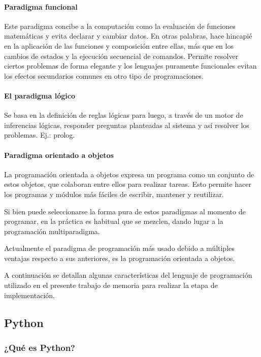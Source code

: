 \documentclass[12pt,legalpaper]{report}
\begin{document}
					\paragraph{Paradigma funcional}
				 
Este paradigma concibe a la computación como la evaluación de funciones matemáticas y evita declarar y cambiar datos. En otras palabras, hace hincapié en la aplicación de las funciones y composición entre ellas, más que en los cambios de estados y la ejecución secuencial de comandos. Permite resolver ciertos problemas de forma elegante y los lenguajes puramente funcionales evitan los efectos secundarios comunes en otro tipo de programaciones.
	
					\paragraph{El paradigma lógico}
				
Se basa en la definición de reglas lógicas para luego, a través de un motor de inferencias lógicas, responder preguntas planteadas al sistema y así resolver los problemas. Ej.: prolog.

	
					\paragraph{Paradigma orientado a objetos}
				
La programación orientada a objetos expresa un programa como un conjunto de estos objetos, que colaboran entre ellos para realizar tareas. Esto permite hacer los programas y módulos más fáciles de escribir, mantener y reutilizar.


Si bien puede seleccionarse la forma pura de estos paradigmas al momento de programar, en la práctica es habitual que se mezclen, dando lugar a la programación multiparadigma.

Actualmente el paradigma de programación más usado debido a múltiples ventajas respecto a sus anteriores, es la programación orientada a objetos.

A continuación se detallan algunas características del lenguaje de programación utilizado en el presente trabajo de memoria para realizar la etapa de implementación.

		\subsection{Python}

			\subsubsection{¿Qué es Python?}
\end{document}
